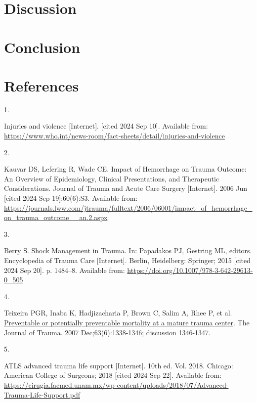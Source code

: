 \documentclass[
]{article}
\newlength{\cslhangindent}
\newlength{\csllabelwidth}
\newlength{\cslentryspacingunit} %
\newenvironment{CSLReferences}[2] %
 {%
  \setlength{\parindent}{0pt}
  \ifodd #1
  \let\oldpar\par
  \def\par{\hangindent=\cslhangindent\oldpar}
  \fi
  \setlength{\parskip}{#2\cslentryspacingunit}
 }%
 {}
\newcommand{\CSLLeftMargin}[1]{\parbox[t]{\csllabelwidth}{#1}}
\newcommand{\CSLRightInline}[1]{\parbox[t]{\linewidth - \csllabelwidth}{#1}\break}
\begin{document}
\hypertarget{discussion}{%
\section{Discussion}\label{discussion}}

\hypertarget{conclusion-1}{%
\section{Conclusion}\label{conclusion-1}}

\hypertarget{references}{%
\section{References}\label{references}}

\hypertarget{refs}{}
\begin{CSLReferences}{0}{0}
\leavevmode{}%
\CSLLeftMargin{1. }%
\CSLRightInline{Injuries and violence {[}Internet{]}. {[}cited 2024 Sep
10{]}. Available from:
\url{https://www.who.int/news-room/fact-sheets/detail/injuries-and-violence}}

\leavevmode{}%
\CSLLeftMargin{2. }%
\CSLRightInline{Kauvar DS, Lefering R, Wade CE. Impact of {Hemorrhage}
on {Trauma} {Outcome}: {An} {Overview} of {Epidemiology}, {Clinical}
{Presentations}, and {Therapeutic} {Considerations}. Journal of Trauma
and Acute Care Surgery {[}Internet{]}. 2006 Jun {[}cited 2024 Sep
19{]};60(6):S3. Available from:
\url{https://journals.lww.com/jtrauma/fulltext/2006/06001/impact_of_hemorrhage_on_trauma_outcome__an.2.aspx}}

\leavevmode{}%
\CSLLeftMargin{3. }%
\CSLRightInline{Berry S. Shock {Management} in {Trauma}. In: Papadakos
PJ, Gestring ML, editors. Encyclopedia of {Trauma} {Care}
{[}Internet{]}. Berlin, Heidelberg: Springer; 2015 {[}cited 2024 Sep
20{]}. p. 1484--8. Available from:
\url{https://doi.org/10.1007/978-3-642-29613-0_505}}

\leavevmode{}%
\CSLLeftMargin{4. }%
\CSLRightInline{Teixeira PGR, Inaba K, Hadjizacharia P, Brown C, Salim
A, Rhee P, et al.
\href{https://doi.org/10.1097/TA.0b013e31815078ae}{Preventable or
potentially preventable mortality at a mature trauma center}. The
Journal of Trauma. 2007 Dec;63(6):1338-1346; discussion 1346-1347. }

\leavevmode{}%
\CSLLeftMargin{5. }%
\CSLRightInline{{ATLS} advanced trauma life support {[}Internet{]}. 10th
ed. Vol. 2018. Chicago: American College of Surgeons; 2018 {[}cited 2024
Sep 22{]}. Available from:
\url{https://cirugia.facmed.unam.mx/wp-content/uploads/2018/07/Advanced-Trauma-Life-Support.pdf}}


\end{CSLReferences}
\end{document}
